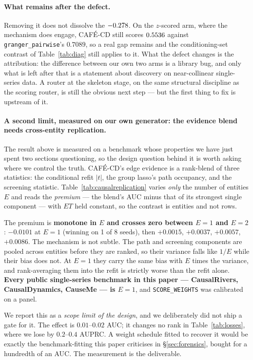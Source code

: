 \documentclass[10pt,twocolumn]{article}
\newcommand{\cafe}{CAF\'E}
\DeclareRobustCommand{\cd}{\cafe{}\nobreakdash-CD}
\begin{document}
\paragraph{What remains after the defect.} Removing it does not dissolve the $-0.278$.
On the $z$-scored arm, where the mechanism does engage, \cd{} still scores $0.5536$
against \texttt{granger\_pairwise}'s $0.7089$, so a real gap remains and the
conditioning-set contrast of Table~\ref{tab:diag} still applies to it. What the defect
changes is the attribution: the difference between our own two arms is a library bug,
and only what is left after that is a statement about discovery on near-collinear
single-series data. A router at the skeleton stage, on the same structural discipline as
the scoring router, is still the obvious next step --- but the first thing to fix is
upstream of it.

\paragraph{A second limit, measured on our own generator: the evidence blend needs
cross-entity replication.} The result above is measured on a benchmark whose properties
we have just spent two sections questioning, so the design question behind it is worth
asking where we control the truth. \cd{}'s edge evidence is a rank-blend of three
statistics: the conditional refit $|t|$, the group lasso's path occupancy, and the
screening statistic. Table~\ref{tab:causalreplication} varies \emph{only} the number of
entities $E$ and reads the \emph{premium} --- the blend's AUC minus that of its
strongest single component --- with $ET$ held constant, so the contrast is entities and
not rows.



\noindent
The premium is \textbf{monotone in $E$ and crosses zero between $E{=}1$ and $E{=}2$}:
$-0.0101$ at $E{=}1$ (winning on 1 of 8 seeds), then $+0.0015$, $+0.0037$, $+0.0057$,
$+0.0086$. The mechanism is not subtle. The path and screening components are pooled
across entities before they are ranked, so their variance falls like $1/E$ while their
bias does not. At $E{=}1$ they carry the same bias with $E$ times the variance, and
rank-averaging them into the refit is strictly worse than the refit alone.
\textbf{Every public single-series benchmark in this paper --- CausalRivers,
CausalDynamics, CauseMe --- is $E{=}1$}, and \texttt{SCORE\_WEIGHTS} was calibrated on a
panel.

We report this as a \emph{scope limit of the design}, and we deliberately did not ship a
gate for it. The effect is $0.01$--$0.02$ AUC; it changes no rank in
Table~\ref{tab:losses}, where we lose by $0.2$--$0.4$ AUPRC. A weight schedule fitted to
recover it would be exactly the benchmark-fitting this paper criticises in
\S\ref{sec:forensics}, bought for a hundredth of an AUC. The measurement is the
deliverable.
\end{document}
